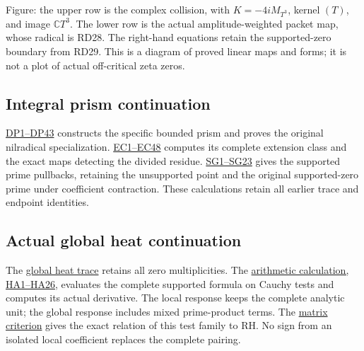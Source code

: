 \documentclass[
  10pt,
  a4paper,
]{article}
\begin{document}
Figure: the upper row is the complex collision, with \(K=-4iM_{T^3}\),
kernel \((T)\), and image \(\mathbb CT^3\). The lower row is the actual
amplitude-weighted packet map, whose radical is RD28. The right-hand
equations retain the supported-zero boundary from RD29. This is a
diagram of proved linear maps and forms; it is not a plot of actual
off-critical zeta zeros.

\subsection{Integral prism
continuation}\label{integral-prism-continuation}

\href{DISTINGUISHED_COLLISION_PRISM_DERIVATION.md}{DP1--DP43} constructs
the specific bounded prism and proves the original nilradical
specialization.
\href{NILRADICAL_COTANGENT_EXTENSION_CLASS_DERIVATION.md}{EC1--EC48}
computes its complete extension class and the exact maps detecting the
divided residue.
\href{SUPPORTED_PRISM_SPECTRUM_DERIVATION.md}{SG1--SG23} gives the
supported prime pullbacks, retaining the unsupported point and the
original supported-zero prime under coefficient contraction. These
calculations retain all earlier trace and endpoint identities.

\subsection{Actual global heat
continuation}\label{actual-global-heat-continuation}

The \href{ACTUAL_HEAT_ZERO_DISTRIBUTION_VARIATION.md}{global heat trace}
retains all zero multiplicities. The
\href{HEAT_CAUCHY_ARITHMETIC_DERIVATION.md}{arithmetic calculation,
HA1--HA26}, evaluates the complete supported formula on Cauchy tests and
computes its actual derivative. The local response keeps the complete
analytic unit; the global response includes mixed prime-product terms.
The \href{CAUCHY_WEIL_POSITIVITY_CRITERION.md}{matrix criterion} gives
the exact relation of this test family to RH. No sign from an isolated
local coefficient replaces the complete pairing.
\end{document}
